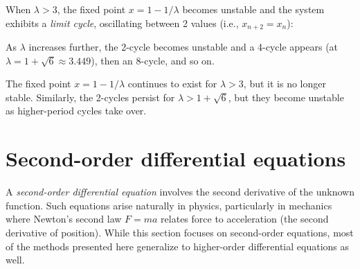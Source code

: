 \documentclass[a4paper]{article}
\begin{document}
\begin{eg}
  When $\lambda > 3$, the fixed point $x = 1 - 1/\lambda$ becomes unstable and the system exhibits a \emph{limit cycle}, oscillating between 2 values (i.e., $x_{n+2} = x_n$):
  \begin{center}
  \end{center}
  As $\lambda$ increases further, the 2-cycle becomes unstable and a 4-cycle appears (at $\lambda = 1 + \sqrt{6} \approx 3.449$), then an 8-cycle, and so on.
\end{eg}

\begin{remark}
  The fixed point $x = 1 - 1/\lambda$ continues to exist for $\lambda > 3$, but it is no longer stable. Similarly, the 2-cycles persist for $\lambda > 1 + \sqrt{6}$, but they become unstable as higher-period cycles take over.
\end{remark}

\section{Second-order differential equations}
A \emph{second-order differential equation} involves the second derivative of the unknown function. Such equations arise naturally in physics, particularly in mechanics where Newton's second law $F = ma$ relates force to acceleration (the second derivative of position). While this section focuses on second-order equations, most of the methods presented here generalize to higher-order differential equations as well.
\end{document}
